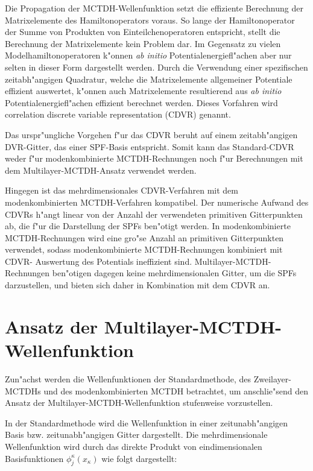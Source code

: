 Die Propagation der MCTDH-Wellenfunktion setzt die effiziente Berechnung der Matrixelemente des Hamiltonoperators voraus.
So lange der Hamiltonoperator der Summe von Produkten von Einteilchenoperatoren \cite{MMC1} entspricht, stellt die Berechnung der Matrixelemente kein Problem dar.
Im Gegensatz zu vielen Modelhamiltonoperatoren k"onnen \textit{ab initio} Potentialenergiefl"achen aber nur selten in dieser Form dargestellt werden.
Durch die Verwendung einer spezifischen zeitabh"angigen Quadratur, welche die Matrixelemente allgemeiner Potentiale effizient auswertet, k"onnen
auch Matrixelemente resultierend aus \textit{ab initio} Potentialenergiefl"achen effizient berechnet werden.
Dieses Vorfahren wird correlation discrete variable representation (CDVR) \cite{M3, vHM2} genannt.

Das urspr"ungliche Vorgehen f"ur das CDVR \cite{M3} beruht auf einem zeitabh"angigen DVR-Gitter, das einer SPF-Basis entspricht.
Somit kann das Standard-CDVR weder f"ur modenkombinierte MCTDH-Rechnungen noch f"ur Berechnungen mit dem Multilayer-MCTDH-Ansatz verwendet werden.

Hingegen ist das mehrdimensionales CDVR-Verfahren mit dem modenkombinierten MCTDH-Verfahren kompatibel. \cite{vHM3}
Der numerische Aufwand des CDVRs h"angt linear von der Anzahl der verwendeten primitiven Gitterpunkten ab, die f"ur die Darstellung der SPFs ben"otigt werden.
In modenkombinierte MCTDH-Rechnungen wird eine gro"se Anzahl an primitiven Gitterpunkten verwendet, sodass modenkombinierte MCTDH-Rechnungen kombiniert mit CDVR-
Auswertung des Potentials ineffizient sind. Multilayer-MCTDH-Rechnungen ben"otigen dagegen keine mehrdimensionalen Gitter, um die SPFs darzustellen, und bieten sich
daher in Kombination mit dem CDVR an.


\section{Ansatz der Multilayer-MCTDH-Wellenfunktion}
Zun"achst  werden die Wellenfunktionen der Standardmethode, des Zweilayer-MCTDHs und des moden\-kombi\-nierten MCTDH betrachtet,
 um anschlie"send den Ansatz der Multilayer-MCTDH-Wellenfunktion
stufenweise vorzustellen.

In der Standardmethode wird die Wellenfunktion in einer zeitunabh"angigen Basis bzw. zeitunabh"angigen Gitter dargestellt.
Die mehrdimensionale Wellenfunktion wird durch das direkte Produkt von eindimensionalen Basisfunktionen $\phi^{\kappa}_{j}(x_{\kappa})$ wie folgt 
dargestellt:

